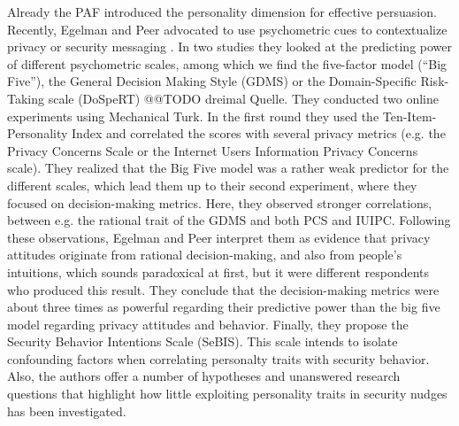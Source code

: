 	Already the PAF introduced the personality dimension for effective persuasion. Recently, Egelman and Peer advocated to use psychometric cues to contextualize privacy or security messaging \cite{Egelman2015AverageUser}. In two studies they looked at the predicting power of different psychometric scales, among which we find the five-factor model (``Big Five''), the General Decision Making Style (GDMS) or the Domain-Specific Risk-Taking scale (DoSpeRT) @@TODO dreimal Quelle. They conducted two online experiments using Mechanical Turk. In the first round they used the Ten-Item-Personality Index and correlated the scores with several privacy metrics (e.g. the Privacy Concerns Scale or the Internet Users Information Privacy Concerns scale). They realized that the Big Five model was a rather weak predictor for the different scales, which lead them up to their second experiment, where they focused on decision-making metrics. Here, they observed stronger correlations, between e.g. the rational trait of the GDMS and both PCS and IUIPC. Following these observations, Egelman and Peer interpret them as evidence that privacy attitudes originate from rational decision-making, and also from people's intuitions, which sounds paradoxical at first, but it were different respondents who produced this result. They conclude that the decision-making metrics were about three times as powerful regarding their predictive power than the big five model regarding privacy attitudes and behavior. Finally, they propose the Security Behavior Intentions Scale (SeBIS). This scale intends to isolate confounding factors when correlating personalty traits with security behavior. Also, the authors offer a number of hypotheses and unanswered research questions that highlight how little exploiting personality traits in security nudges has been investigated. 
	
	
	